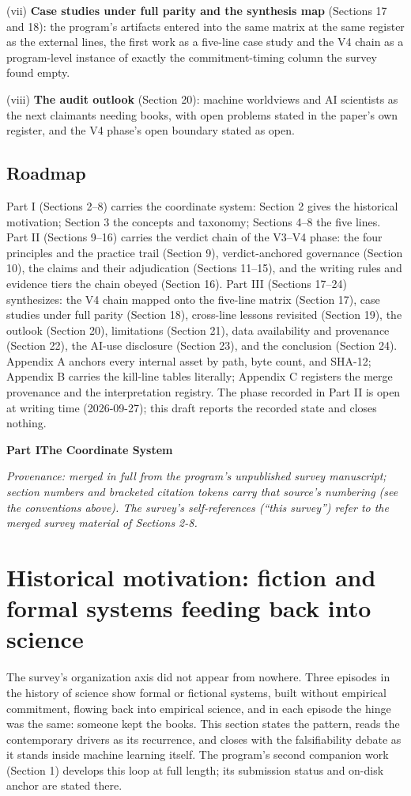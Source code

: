\documentclass[11pt]{article}
\newcommand{\paperpart}[2]{\par\addvspace{2.4em}\begin{center}{\Large\bfseries Part #1\quad\textperiodcentered\quad #2}\end{center}\addvspace{0.4em}}
\begin{document}
\noindent (vii) \textbf{Case studies under full parity and the synthesis map} (Sections 17 and 18): the program's artifacts entered into the same matrix at the same register as the external lines, the first work as a five-line case study and the V4 chain as a program-level instance of exactly the commitment-timing column the survey found empty.\par
\noindent (viii) \textbf{The audit outlook} (Section 20): machine worldviews and AI scientists as the next claimants needing books, with open problems stated in the paper's own register, and the V4 phase's open boundary stated as open.\par
\subsection{Roadmap}
\noindent Part I (Sections 2–8) carries the coordinate system: Section 2 gives the historical motivation; Section 3 the concepts and taxonomy; Sections 4–8 the five lines. Part II (Sections 9–16) carries the verdict chain of the V3–V4 phase: the four principles and the practice trail (Section 9), verdict-anchored governance (Section 10), the claims and their adjudication (Sections 11–15), and the writing rules and evidence tiers the chain obeyed (Section 16). Part III (Sections 17–24) synthesizes: the V4 chain mapped onto the five-line matrix (Section 17), case studies under full parity (Section 18), cross-line lessons revisited (Section 19), the outlook (Section 20), limitations (Section 21), data availability and provenance (Section 22), the AI-use disclosure (Section 23), and the conclusion (Section 24). Appendix A anchors every internal asset by path, byte count, and SHA-12; Appendix B carries the kill-line tables literally; Appendix C registers the merge provenance and the interpretation registry. The phase recorded in Part II is open at writing time (2026-09-27); this draft reports the recorded state and closes nothing.\par
\paperpart{I}{The Coordinate System}
\noindent\emph{Provenance: merged in full from the program's unpublished survey manuscript; section numbers and bracketed citation tokens carry that source's numbering (see the conventions above). The survey's self-references (``this survey'') refer to the merged survey material of Sections 2-8.}\par
\section{Historical motivation: fiction and formal systems feeding back into science}
\label{sec:2}
\noindent The survey's organization axis did not appear from nowhere. Three episodes in the history of science show formal or fictional systems, built without empirical commitment, flowing back into empirical science, and in each episode the hinge was the same: someone kept the books. This section states the pattern, reads the contemporary drivers as its recurrence, and closes with the falsifiability debate as it stands inside machine learning itself. The program's second companion work (Section 1) develops this loop at full length; its submission status and on-disk anchor are stated there.\par
\end{document}
